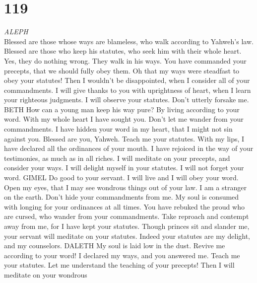 \hypertarget{section-118}{%
\section{119}\label{section-118}}

\emph{ALEPH}\\
 Blessed are those whose ways are blameless, who walk
according to Yahweh's law.  Blessed are those who keep his
statutes, who seek him with their whole heart.  Yes, they
do nothing wrong. They walk in his ways.  You have
commanded your precepts, that we should fully obey them. 
Oh that my ways were steadfast to obey your statutes! 
Then I wouldn't be disappointed, when I consider all of your
commandments.  I will give thanks to you with uprightness
of heart, when I learn your righteous judgments.  I will
observe your statutes. Don't utterly forsake me. BETH  How
can a young man keep his way pure? By living according to your word.
 With my whole heart I have sought you. Don't let me
wander from your commandments.  I have hidden your word
in my heart, that I might not sin against you.  Blessed
are you, Yahweh. Teach me your statutes.  With my lips, I
have declared all the ordinances of your mouth.  I have
rejoiced in the way of your testimonies, as much as in all riches.
 I will meditate on your precepts, and consider your
ways.  I will delight myself in your statutes. I will not
forget your word. GIMEL  Do good to your servant. I will
live and I will obey your word.  Open my eyes, that I may
see wondrous things out of your law.  I am a stranger on
the earth. Don't hide your commandments from me.  My soul
is consumed with longing for your ordinances at all times.
 You have rebuked the proud who are cursed, who wander
from your commandments.  Take reproach and contempt away
from me, for I have kept your statutes.  Though princes
sit and slander me, your servant will meditate on your statutes.
 Indeed your statutes are my delight, and my counselors.
DALETH  My soul is laid low in the dust. Revive me
according to your word!  I declared my ways, and you
answered me. Teach me your statutes.  Let me understand
the teaching of your precepts! Then I will meditate on your wondrous
